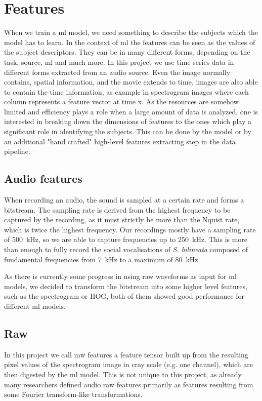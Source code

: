 \section{Features}
When we train a \gls{ml} model, we need something to describe the subjects which the model has to learn. In the context of \gls{ml} the features can be seen as the values of the subject descriptors. They can be in many different forms, depending on the task, source, \gls{ml} and much more. In this project we use time series data in different forms extracted from an audio source.
Even the image normally contains, spatial information, and the movie extends to time, images are also able to contain the time information, as example in spectrogram images where each column represents a feature vector at time x.
As the resources are somehow limited and efficiency plays a role when a large amount of data is analyzed, one is interested in breaking down the dimensions of features to the ones which play a significant role in identifying the subjects. This can be done by the model or by an additional "hand crafted" high-level features extracting step in the data pipeline.

\subsection{Audio features}
When recording an audio, the sound is sampled at a certain rate and forms a bitstream.
The sampling rate is derived from the highest frequency to be captured by the recording, as it must strictly be more than the Nquist rate, which is twice the highest frequency.
Our recordings mostly have a sampling rate of \SI{500}{\kHz}, so we are able to capture frequencies up to \SI{250}{\kHz}.
This is more than enough to fully record the social vocalisations of \emph{S. bilineata} composed of fundamental frequencies from \SI{7}{\kHz} to a maximum of \SI{80}{\kHz}.


As there is currently some progress in using raw waveforms as input for \gls{ml} models, we decided to transform the bitstream into some higher level features, such as the spectrogram or HOG, both of them showed good performance for different \gls{ml} models.


\subsection{Raw}
In this project we call raw features a feature tensor built up from the resulting pixel values of the spectrogram image in cray scale (e.g. one channel), which are then digested by the \gls{ml} model.
This is not unique to this project, as already many researchers defined audio raw features primarily as features resulting from some Fourier transform-like transformations.

